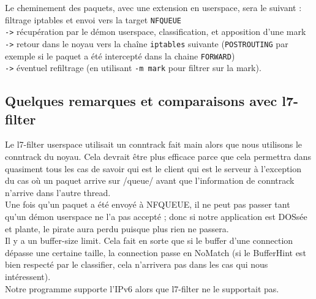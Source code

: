 Le cheminement des paquets, avec une extension en userspace, sera le suivant :\\
filtrage iptables et envoi vers la target \verb+NFQUEUE+\\
\verb+->+ récupération par le démon userspace, classification, et apposition d'une mark\\
\verb+->+ retour dans le noyau vers la chaîne \verb+iptables+ suivante (\verb+POSTROUTING+ par exemple si le paquet a été intercepté dans la chaine \verb+FORWARD+)\\
\verb+->+ éventuel refiltrage (en utilisant \verb+-m mark+ pour filtrer sur la mark).


\subsection{Quelques remarques et comparaisons avec l7-filter}
Le l7-filter userspace utilisait un conntrack fait main alors que nous utilisons le conntrack du noyau. Cela devrait être plus efficace parce que cela permettra dans quasiment tous les cas de savoir qui est le client qui est le serveur à l'exception du cas où un paquet arrive sur /queue/ avant que l'information de conntrack n'arrive dans l'autre thread.\\

Une fois qu'un paquet a été envoyé à NFQUEUE, il ne peut pas passer
tant qu'un démon userspace ne l'a pas accepté ; donc si notre application est
DOSsée et plante, le pirate aura perdu puisque plus rien ne passera.\\

Il y a un buffer-size limit. Cela fait en sorte que si le
buffer d'une connection dépasse une certaine taille, la connection
passe en NoMatch (si le BufferHint est bien respecté par le
classifier, cela n'arrivera pas dans les cas qui nous intéressent).\\

Notre programme supporte l'IPv6 alors que l7-filter ne le supportait pas.
